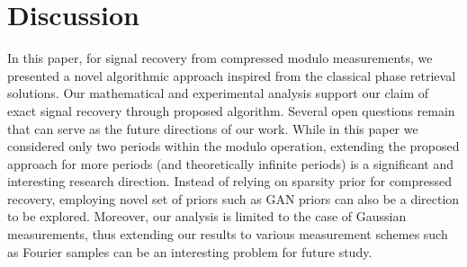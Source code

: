 \section{Discussion}
\label{sec:disc}
In this paper, for signal recovery from compressed modulo measurements, we presented a novel algorithmic approach inspired from the classical phase retrieval solutions. Our mathematical and experimental analysis support our claim of exact signal recovery through proposed algorithm. Several open questions remain that can serve as the future directions of our work. While in this paper we considered only two periods within the modulo operation, extending the proposed approach for more periods (and theoretically infinite periods) is a significant and interesting research direction. Instead of relying on sparsity prior for compressed recovery, employing novel set of priors such as GAN priors\cite{bora2017compressed,shah2018solving} can also be a direction to be explored. Moreover, our analysis is limited to the case of Gaussian measurements, thus extending our results to various measurement schemes such as Fourier samples can be an interesting problem for future study. 